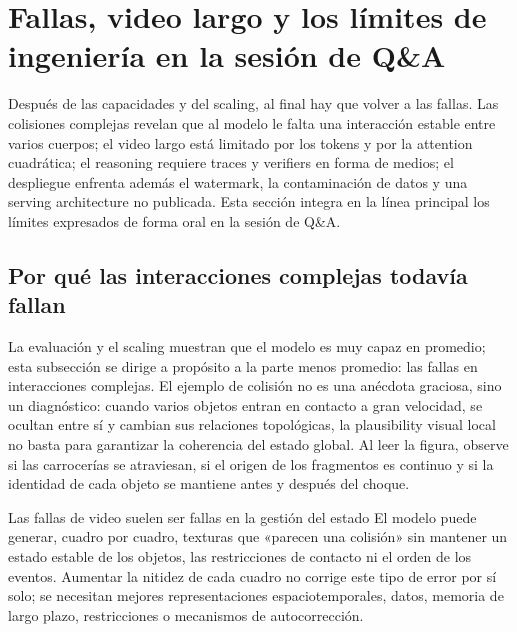 \section{Fallas, video largo y los límites de ingeniería en la sesión de Q\&A}

Después de las capacidades y del scaling, al final hay que volver a las fallas. Las colisiones complejas revelan que al modelo le falta una interacción estable entre varios cuerpos; el video largo está limitado por los tokens y por la attention cuadrática; el reasoning requiere traces y verifiers en forma de medios; el despliegue enfrenta además el watermark, la contaminación de datos y una serving architecture no publicada. Esta sección integra en la línea principal los límites expresados de forma oral en la sesión de Q\&A.

\subsection{Por qué las interacciones complejas todavía fallan}

La evaluación y el scaling muestran que el modelo es muy capaz en promedio; esta subsección se dirige a propósito a la parte menos promedio: las fallas en interacciones complejas. El ejemplo de colisión no es una anécdota graciosa, sino un diagnóstico: cuando varios objetos entran en contacto a gran velocidad, se ocultan entre sí y cambian sus relaciones topológicas, la plausibility visual local no basta para garantizar la coherencia del estado global. Al leer la figura, observe si las carrocerías se atraviesan, si el origen de los fragmentos es continuo y si la identidad de cada objeto se mantiene antes y después del choque.


\begin{warningbox}{Las fallas de video suelen ser fallas en la gestión del estado}
El modelo puede generar, cuadro por cuadro, texturas que «parecen una colisión» sin mantener un estado estable de los objetos, las restricciones de contacto ni el orden de los eventos. Aumentar la nitidez de cada cuadro no corrige este tipo de error por sí solo; se necesitan mejores representaciones espaciotemporales, datos, memoria de largo plazo, restricciones o mecanismos de autocorrección.
\end{warningbox}

